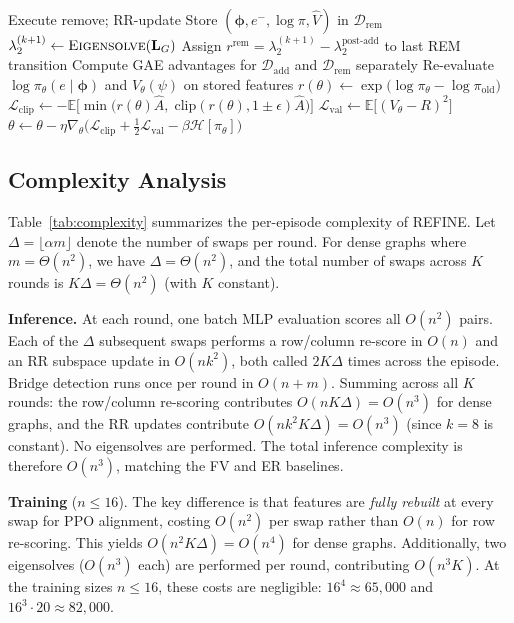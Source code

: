 \documentclass{article}
\begin{document}
\begin{algorithm}[t]
\begin{algorithmic}[1]
                \State Execute remove; RR-update
                \State Store $(\boldsymbol{\phi}, e^-, \log\pi, \hat{V})$ in $\mathcal{D}_{\text{rem}}$
            \EndFor
            \State $\lambda_2^{(k+1)} \gets \textsc{Eigensolve}(\mathbf{L}_G)$
            \State Assign $r^{\text{rem}} = \lambda_2^{(k+1)} - \lambda_2^{\text{post-add}}$ to last REM transition
        \EndFor
    \EndFor
    \State Compute GAE advantages for $\mathcal{D}_{\text{add}}$ and $\mathcal{D}_{\text{rem}}$ separately
     
        \State Re-evaluate $\log\pi_\theta(e \mid \boldsymbol{\phi})$ and $V_\theta(\psi)$ on stored features
        \State $r(\theta) \gets \exp\bigl(\log\pi_\theta - \log\pi_{\text{old}}\bigr)$
        \State $\mathcal{L}_{\text{clip}} \gets -\mathbb{E}\bigl[\min\bigl(r(\theta)\hat{A},\; \text{clip}(r(\theta), 1{\pm}\epsilon)\hat{A}\bigr)\bigr]$
        \State $\mathcal{L}_{\text{val}} \gets \mathbb{E}\bigl[(V_\theta - R)^2\bigr]$
        \State $\theta \gets \theta - \eta \nabla_\theta \bigl(\mathcal{L}_{\text{clip}} + \tfrac{1}{2}\mathcal{L}_{\text{val}} - \beta \mathcal{H}[\pi_\theta]\bigr)$
    \EndFor
\EndFor
\end{algorithmic}
\end{algorithm}

\subsection{Complexity Analysis}

Table~\ref{tab:complexity} summarizes the per-episode complexity of REFINE. Let $\Delta = \lfloor \alpha m \rfloor$ denote the number of swaps per round. For dense graphs where $m = \Theta(n^2)$, we have $\Delta = \Theta(n^2)$, and the total number of swaps across $K$ rounds is $K\Delta = \Theta(n^2)$ (with $K$ constant).

\textbf{Inference.} At each round, one batch MLP evaluation scores all $O(n^2)$ pairs. Each of the $\Delta$ subsequent swaps performs a row/column re-score in $O(n)$ and an RR subspace update in $O(nk^2)$, both called $2K\Delta$ times across the episode. Bridge detection runs once per round in $O(n + m)$. Summing across all $K$ rounds: the row/column re-scoring contributes $O(nK\Delta) = O(n^3)$ for dense graphs, and the RR updates contribute $O(nk^2 K\Delta) = O(n^3)$ (since $k = 8$ is constant). No eigensolves are performed. The total inference complexity is therefore $O(n^3)$, matching the FV and ER baselines.

\textbf{Training} ($n \leq 16$). The key difference is that features are \emph{fully rebuilt} at every swap for PPO alignment, costing $O(n^2)$ per swap rather than $O(n)$ for row re-scoring. This yields $O(n^2 K\Delta) = O(n^4)$ for dense graphs. Additionally, two eigensolves ($O(n^3)$ each) are performed per round, contributing $O(n^3 K)$. At the training sizes $n \leq 16$, these costs are negligible: $16^4 \approx 65{,}000$ and $16^3 \cdot 20 \approx 82{,}000$.
\end{document}
